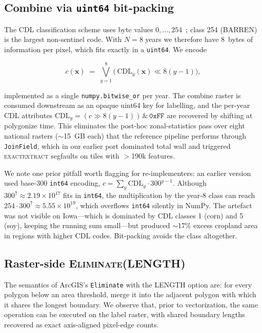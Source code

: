 \documentclass[preprint,12pt]{elsarticle}
\begin{document}
\subsection{Combine via \texttt{uint64} bit-packing}
\label{sec:method-combine}

The CDL classification scheme uses byte values
$0,\ldots,254$~\cite{boryan2011cdl}; class 254 (BARREN) is the largest
non-sentinel code. With $N=8$ years we therefore have 8~bytes of
information per pixel, which fits exactly in a \texttt{uint64}. We
encode

\[
c(\mathbf{x}) \;=\; \bigvee_{y=1}^{8} \bigl(\,\text{CDL}_y(\mathbf{x}) \ll 8(y-1)\bigr),
\]

implemented as a single \texttt{numpy.bitwise\_or} per year. The
combine raster is consumed downstream as an opaque uint64 key for
labelling, and the per-year CDL attributes
$\text{CDL}_y = (c \gg 8(y-1)) \,\&\, \mathtt{0xFF}$ are recovered by
shifting at polygonize time. This eliminates the post-hoc
zonal-statistics pass over eight national rasters ($\sim$15~GB each)
that the reference pipeline performs through \texttt{JoinField}, which
in our earlier port dominated total wall and triggered
\textsc{exactextract} segfaults on tiles with $>$190k features.

We note one prior pitfall worth flagging for re-implementers: an
earlier version used base-$300$ \texttt{int64} encoding,
$c = \sum_y \text{CDL}_y \cdot 300^{y-1}$. Although $300^7 \approx
2.19 \times 10^{17}$ fits in \texttt{int64}, the multiplication by
the year-8 class can reach $254 \cdot 300^7 \approx 5.55 \times 10^{19}$,
which overflows \texttt{int64} silently in NumPy. The artefact was
not visible on Iowa---which is dominated by CDL classes 1 (corn) and 5
(soy), keeping the running sum small---but produced $\sim$17\% excess
cropland area in regions with higher CDL codes. Bit-packing avoids the
class altogether.

\subsection{Raster-side \textsc{Eliminate(LENGTH)}}
\label{sec:method-eliminate}

The semantics of ArcGIS's \texttt{Eliminate} with the
\textsc{LENGTH} option are: for every polygon below an area threshold,
merge it into the adjacent polygon with which it shares the longest
boundary. We observe that, prior to vectorization, the same operation
can be executed on the label raster, with shared boundary lengths
recovered as exact axis-aligned pixel-edge counts.
\end{document}
